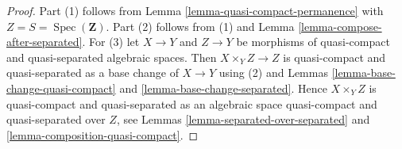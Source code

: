 \documentclass[10pt,a4paper]{amsart}
\theoremstyle{plain}
\theoremstyle{definition}
\theoremstyle{remark}
\numberwithin{equation}{subsection}
\def\Spec{\mathop{\mathrm{Spec}}}
\begin{document}
\begin{proof}
Part (1) follows from
Lemma \ref{lemma-quasi-compact-permanence}
with $Z = S = \Spec(\mathbf{Z})$.
Part (2) follows from (1) and
Lemma \ref{lemma-compose-after-separated}.
For (3) let $X \to Y$ and $Z \to Y$ be morphisms
of quasi-compact and quasi-separated algebraic spaces. Then
$X \times_Y Z \to Z$ is quasi-compact and quasi-separated as a
base change of $X \to Y$ using (2) and
Lemmas \ref{lemma-base-change-quasi-compact} and
\ref{lemma-base-change-separated}.
Hence $X \times_Y Z$ is quasi-compact and quasi-separated as
an algebraic space quasi-compact and quasi-separated over
$Z$, see
Lemmas \ref{lemma-separated-over-separated} and
\ref{lemma-composition-quasi-compact}.
\end{proof}
\end{document}
